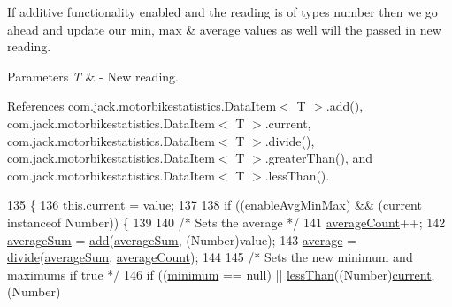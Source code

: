 If additive functionality enabled and the reading is of types number then we go ahead and update our min, max \& average values as well will the passed in new reading.


\begin{DoxyParams}{Parameters}
{\em T} & -\/ New reading. \\
\hline
\end{DoxyParams}


References com.\+jack.\+motorbikestatistics.\+Data\+Item$<$ T $>$.\+add(), com.\+jack.\+motorbikestatistics.\+Data\+Item$<$ T $>$.\+current, com.\+jack.\+motorbikestatistics.\+Data\+Item$<$ T $>$.\+divide(), com.\+jack.\+motorbikestatistics.\+Data\+Item$<$ T $>$.\+greater\+Than(), and com.\+jack.\+motorbikestatistics.\+Data\+Item$<$ T $>$.\+less\+Than().


\begin{DoxyCode}
135                                     \{
136         this.\hyperlink{classcom_1_1jack_1_1motorbikestatistics_1_1_data_item_a48cf1c273c44e2181a99d56c48868d1d}{current} = value;
137 
138         \textcolor{keywordflow}{if} ((\hyperlink{classcom_1_1jack_1_1motorbikestatistics_1_1_data_item_a7cfeefe9064017755f8462421693d2a9}{enableAvgMinMax}) && (\hyperlink{classcom_1_1jack_1_1motorbikestatistics_1_1_data_item_a48cf1c273c44e2181a99d56c48868d1d}{current} instanceof Number)) \{
139 
140             \textcolor{comment}{/* Sets the average */}
141             \hyperlink{classcom_1_1jack_1_1motorbikestatistics_1_1_data_item_aaa50027610a16f6a373f0cd3f5a96333}{averageCount}++;
142             \hyperlink{classcom_1_1jack_1_1motorbikestatistics_1_1_data_item_ab1d6f0c800def7c32486e31e8195349e}{averageSum} = \hyperlink{classcom_1_1jack_1_1motorbikestatistics_1_1_data_item_a4a5ad17bfa8a12bc05f6c02de92d6b36}{add}(\hyperlink{classcom_1_1jack_1_1motorbikestatistics_1_1_data_item_ab1d6f0c800def7c32486e31e8195349e}{averageSum}, (Number)value);
143             \hyperlink{classcom_1_1jack_1_1motorbikestatistics_1_1_data_item_a720fe4f7fa02578cc8e0a59ef784746d}{average} = \hyperlink{classcom_1_1jack_1_1motorbikestatistics_1_1_data_item_aab2f3e4b1cfbceb79b6477020798c417}{divide}(\hyperlink{classcom_1_1jack_1_1motorbikestatistics_1_1_data_item_ab1d6f0c800def7c32486e31e8195349e}{averageSum}, \hyperlink{classcom_1_1jack_1_1motorbikestatistics_1_1_data_item_aaa50027610a16f6a373f0cd3f5a96333}{averageCount});
144 
145             \textcolor{comment}{/* Sets the new minimum and maximums if true */}
146             \textcolor{keywordflow}{if} ((\hyperlink{classcom_1_1jack_1_1motorbikestatistics_1_1_data_item_a770342aaa7248e9687517864d73f0009}{minimum} == null) || \hyperlink{classcom_1_1jack_1_1motorbikestatistics_1_1_data_item_af8d81a7e3c07f7c3a02035c872159388}{lessThan}((Number)\hyperlink{classcom_1_1jack_1_1motorbikestatistics_1_1_data_item_a48cf1c273c44e2181a99d56c48868d1d}{current}, (Number)

\end{DoxyCode}
